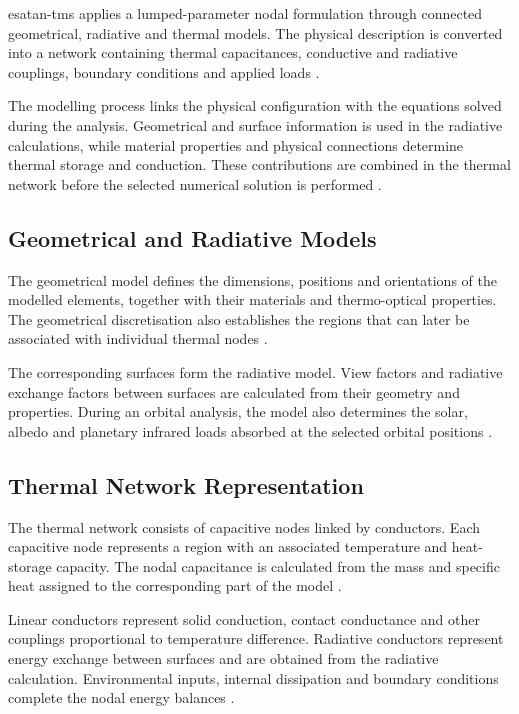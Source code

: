 \acrshort{esatan-tms} applies a lumped-parameter nodal formulation through connected 
geometrical, radiative and thermal models. The physical description is converted into 
a network containing thermal capacitances, conductive and radiative couplings, boundary 
conditions and applied loads 
\cite{thermal_eng_man,esatan_user_man,esatan_gsg}.

The modelling process links the physical configuration with the equations solved during 
the analysis. Geometrical and surface information is used in the radiative calculations, 
while material properties and physical connections determine thermal storage and 
conduction. These contributions are combined in the thermal network before the selected 
numerical solution is performed 
\cite{thermal_eng_man,esatan_user_man}.

\subsection{Geometrical and Radiative Models}

The geometrical model defines the dimensions, positions and orientations of the modelled 
elements, together with their materials and thermo-optical properties. The geometrical discretisation 
also establishes the regions that can later be associated with individual thermal nodes 
\cite{esatan_user_man,esatan_gsg}.

The corresponding surfaces form the radiative model. View factors and radiative exchange 
factors between surfaces are calculated from their geometry and properties. During an 
orbital analysis, the model also determines the solar, albedo and planetary infrared 
loads absorbed at the selected orbital positions 
\cite{esatan_user_man,esatan_gsg,ecss_man}.

\subsection{Thermal Network Representation}

The thermal network consists of capacitive nodes linked by conductors. Each capacitive 
node represents a region with an associated temperature and heat-storage capacity. The 
nodal capacitance is calculated from the mass and specific heat assigned to the 
corresponding part of the model 
\cite{thermal_eng_man,esatan_user_man}.

Linear conductors represent solid conduction, contact conductance and other couplings 
proportional to temperature difference. Radiative conductors represent energy exchange 
between surfaces and are obtained from the radiative calculation. Environmental inputs, 
internal dissipation and boundary conditions complete the nodal energy balances 
\cite{thermal_eng_man,esatan_user_man,esatan_training_man}.

